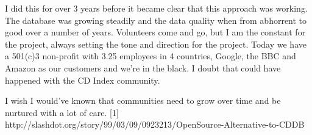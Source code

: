 I did this for over 3 years before it became clear that this approach was working. The database was growing steadily and the data quality when from abhorrent to good over a number of years.  Volunteers come and go, but I am the constant for the project, always setting the tone and direction for the project. Today we have a 501(c)3 non-profit with 3.25 employees in 4 countries, Google, the BBC and Amazon as our customers and we’re in the black. I doubt that could have happened with the CD Index community.

I wish I would've known that communities need to grow over time and be nurtured with a lot of care.
[1] http://slashdot.org/story/99/03/09/0923213/OpenSource-Alternative-to-CDDB